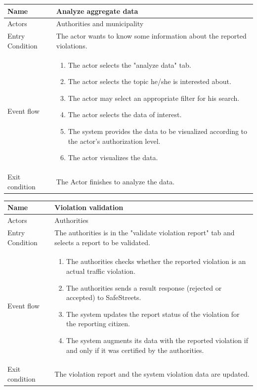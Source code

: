 \vskip 0.2in
\begin{tabular}{|p{3.1cm}|p{11.6cm}|}
\hline
Name & Analyze aggregate data\\
\hline
Actors & Authorities and municipality\\
\hline
Entry Condition & The actor wants to know some information about the reported violations.\\
\hline
Event flow & \begin{enumerate}
                \item The actor selects the "analyze data" tab.
                \item The actor selects the topic he/she is interested about.
                \item The actor may select an appropriate filter for his search.
                \item The actor selects the data of interest.
                \item The system provides the data to be visualized according to the actor's authorization level.
                \item The actor visualizes the data.
            \end{enumerate}\\
\hline
Exit condition & The Actor finishes to analyze the data.\\
\hline
\end{tabular}

\vskip 0.2in
\begin{tabular}{|p{3.1cm}|p{11.6cm}|}
\hline
Name & Violation validation\\
\hline
Actors & Authorities\\
\hline
Entry Condition & The authorities is in the "validate violation report" tab and selects a report to be validated.\\
\hline
Event flow & \begin{enumerate}
                \item The authorities checks whether the reported violation is an actual traffic violation.
                \item The authorities sends a result response (rejected or accepted) to SafeStreets.
                \item The system updates the report status of the violation for the reporting citizen.
                \item The system augments its data with the reported violation if and only if it was certified by the authorities.
            \end{enumerate}\\
\hline
Exit condition & The violation report and the system violation data are updated.\\
\hline
\end{tabular}

